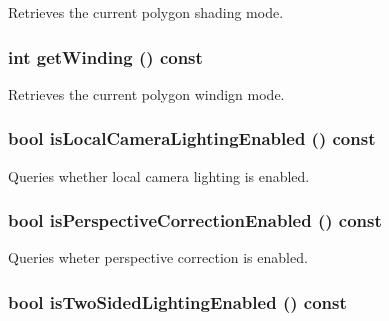 Retrieves the current polygon shading mode. \hypertarget{classm3g_1_1PolygonMode_6000aac10def51a7c7f12e1381bce19d}{
\subsubsection[{getWinding}]{\setlength{\rightskip}{0pt plus 5cm}int getWinding () const}}
\label{classm3g_1_1PolygonMode_6000aac10def51a7c7f12e1381bce19d}


Retrieves the current polygon windign mode. \hypertarget{classm3g_1_1PolygonMode_b8db417fcee613ac80e84087046930cd}{
\subsubsection[{isLocalCameraLightingEnabled}]{\setlength{\rightskip}{0pt plus 5cm}bool isLocalCameraLightingEnabled () const}}
\label{classm3g_1_1PolygonMode_b8db417fcee613ac80e84087046930cd}


Queries whether local camera lighting is enabled. \hypertarget{classm3g_1_1PolygonMode_76ec871d6ed45e6e6a8822f5c45c828b}{
\subsubsection[{isPerspectiveCorrectionEnabled}]{\setlength{\rightskip}{0pt plus 5cm}bool isPerspectiveCorrectionEnabled () const}}
\label{classm3g_1_1PolygonMode_76ec871d6ed45e6e6a8822f5c45c828b}


Queries wheter perspective correction is enabled. \hypertarget{classm3g_1_1PolygonMode_e7b9f0464063485b025f11a310bb0b80}{
\subsubsection[{isTwoSidedLightingEnabled}]{\setlength{\rightskip}{0pt plus 5cm}bool isTwoSidedLightingEnabled () const}}
\label{classm3g_1_1PolygonMode_e7b9f0464063485b025f11a310bb0b80}


